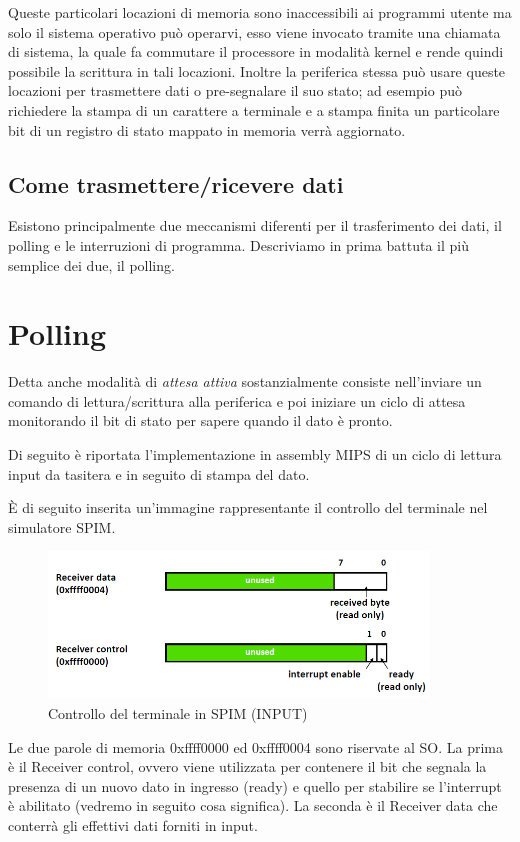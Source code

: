 \documentclass[class=book, crop=false, oneside]{standalone}
\begin{document}
Queste particolari locazioni di memoria sono inaccessibili ai programmi utente ma solo il sistema operativo può operarvi, esso viene invocato tramite una chiamata di sistema, la quale fa commutare il processore in modalità kernel e rende quindi possibile la scrittura in tali locazioni.
Inoltre la periferica stessa può usare queste locazioni per trasmettere dati o pre-segnalare il suo stato; ad esempio può richiedere la stampa di un carattere a terminale e a stampa finita un particolare bit di un registro di stato mappato in memoria verrà aggiornato.

\subsection{Come trasmettere/ricevere dati}
Esistono principalmente due meccanismi diferenti per il trasferimento dei dati, il polling e le interruzioni di programma.
Descriviamo in prima battuta il più semplice dei due, il polling.

\section{Polling}
Detta anche modalità di \emph{attesa attiva} sostanzialmente consiste nell'inviare un comando di lettura/scrittura alla periferica e poi iniziare un ciclo di attesa monitorando il bit di stato per sapere quando il dato è pronto.

Di seguito è riportata l'implementazione in assembly MIPS di un ciclo di lettura input da tasitera e in seguito di stampa del dato.

È di seguito inserita un'immagine rappresentante il controllo del terminale nel simulatore SPIM.
\begin{figure}
	\centering
	\includegraphics[width=0.9\textwidth,keepaspectratio]{SPIM1}
	\caption{Controllo del terminale in SPIM (INPUT)}
\end{figure}

Le due parole di memoria 0xffff0000 ed 0xffff0004 sono riservate al SO.
La prima è il Receiver control, ovvero viene utilizzata per contenere il bit che segnala la presenza di un nuovo dato in ingresso (ready) e quello per stabilire se l'interrupt è abilitato (vedremo in seguito cosa significa).
La seconda è il Receiver data che conterrà gli effettivi dati forniti in input.
\end{document}

